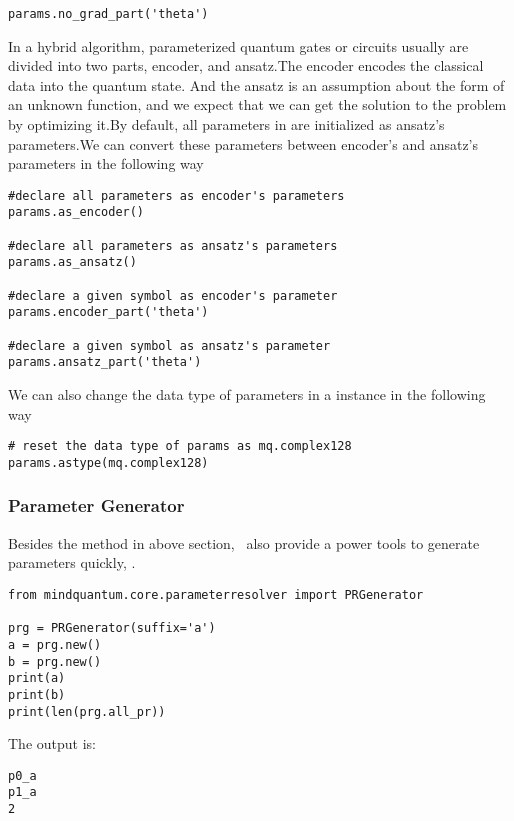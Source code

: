 \begin{lstlisting}
params.no_grad_part('theta')
\end{lstlisting}

In a hybrid algorithm, parameterized quantum gates or circuits usually are divided into two parts, encoder, and ansatz.The encoder encodes the classical data into the quantum state. And the ansatz is an assumption about the form of an unknown function, and we expect that we can get the solution to the problem by optimizing it.By default, all parameters in \ParameterResolver are initialized as ansatz's parameters.We can convert these parameters between encoder's and ansatz's parameters in the following way

\begin{lstlisting}
#declare all parameters as encoder's parameters
params.as_encoder()

#declare all parameters as ansatz's parameters
params.as_ansatz()

#declare a given symbol as encoder's parameter
params.encoder_part('theta')

#declare a given symbol as ansatz's parameter
params.ansatz_part('theta')
\end{lstlisting}

We can also change the data type of parameters in a \ParameterResolver instance in the following way
\begin{lstlisting}
# reset the data type of params as mq.complex128
params.astype(mq.complex128)
\end{lstlisting}

\subsubsection{Parameter Generator}

Besides the method in above section, \MindQuantum\ also provide a power tools to generate parameters quickly, \PRGenerator.
\begin{lstlisting}
from mindquantum.core.parameterresolver import PRGenerator

prg = PRGenerator(suffix='a')
a = prg.new()
b = prg.new()
print(a)
print(b)
print(len(prg.all_pr))
\end{lstlisting}
The output is:
\begin{lstlisting}
p0_a
p1_a
2
\end{lstlisting}
